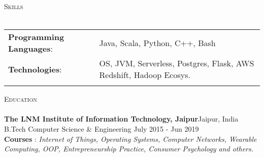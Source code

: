 \documentclass[a4paper]{article}
\newcommand{\lineunder} {
    \vspace*{-8pt} \\
    \hspace*{-18pt} \hrulefill \\
}
\newcommand{\header} [1] {
    {\hspace*{-18pt}\vspace*{6pt} \textsc{#1}}
    \vspace*{-6pt} \lineunder
}
\begin{document}
\header{Skills}
\vspace{2mm}
\begin{tabular}{ ll}
	\textbf{Programming Languages}: & Java, Scala, Python, C++, Bash                       \\
	\textbf{Technologies}:           & OS, JVM, Serverless, Postgres, Flask, AWS Redshift, Hadoop Ecosys.  \\
	\vspace{1mm}
\end{tabular}

\header{Education}
\textbf{The LNM Institute of Information Technology, Jaipur}\hfill Jaipur, India\\
B.Tech Computer Science \& Engineering \hfill July 2015 - Jun 2019\\
	\vspace{2mm}
\textbf{Courses} : 
\textit{Internet of Things, Operating Systems, Computer Networks, Wearable Computing, OOP, Entrepreneurship Practice, Consumer Psychology and others.}
\vspace{2mm}


\vspace*{2mm}

\ 
\end{document}
